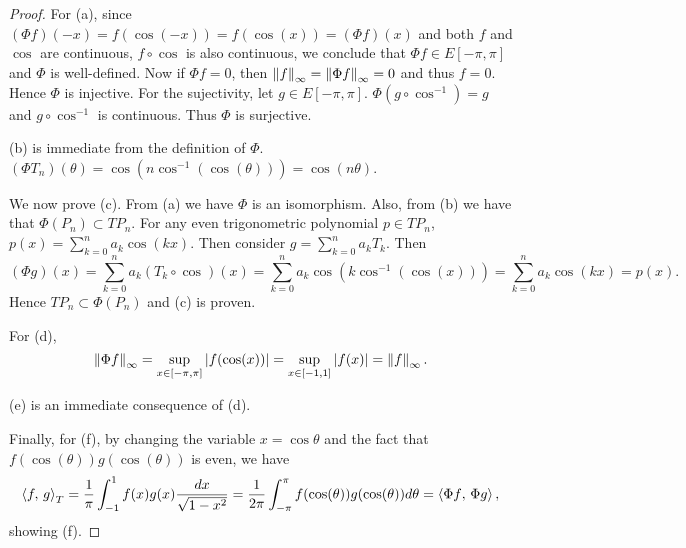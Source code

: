 \begin{proof}
    For (a), since $(\Phi f)(-x) = f(\cos(-x)) = f(\cos(x)) =( \Phi f)(x)$ and 
    both $f$ and $\cos$ are continuous, $f\circ \cos$ is also continuous, 
    we conclude that $\Phi f\in E[-\pi,\pi]$ and $\Phi$ is well-defined. 
    Now if $\Phi f = 0$, then $\left\lVert {f} \right\rVert_\infty = \left\lVert {\Phi f} \right\rVert_\infty = 0$ 
    and thus $f = 0$. Hence $\Phi$ is injective. For the sujectivity, let 
    $g\in E[-\pi,\pi]$. $\Phi (g\circ\cos^{-1}) = g$ and $g\circ\cos^{-1}$ 
    is continuous. Thus $\Phi$ is surjective. 

    (b) is immediate from the definition of $\Phi$. $(\Phi T_n)(\theta) 
    = \cos(n\cos^{-1}(\cos(\theta))) = \cos(n\theta)$.

    We now prove (c). From (a) we have $\Phi$ is an isomorphism. Also, 
    from (b) we have that $\Phi(P_n)\subset TP_n$. For any even trigonometric 
    polynomial $p\in TP_n$, $p(x) = \sum_{k=0}^n a_k\cos(kx)$. Then 
    consider $g = \sum_{k=0}^{n} a_kT_k$. Then 
    \begin{equation*}
        (\Phi g)(x) = \sum_{k=0}^{n} a_k(T_k\circ\cos)(x) = \sum_{k=0}^{n} a_k\cos(k\cos^{-1}(\cos(x))) = \sum_{k=0}^{n} a_k\cos(kx) = p(x).
    \end{equation*}
    Hence $TP_n\subset \Phi(P_n)$ and (c) is proven. 

    For (d), 
    \begin{equation*}
        \left\lVert {\Phi f} \right\rVert_\infty = \sup_{x\in[-\pi,\pi]} \left\lvert {f(\cos(x))} \right\rvert = \sup_{x\in[-1,1]}\left\lvert {f(x)} \right\rvert = \left\lVert {f} \right\rVert_\infty.
    \end{equation*} 

    (e) is an immediate consequence of (d). 

    Finally, for (f), by changing the variable $x = \cos\theta$ and 
    the fact that $f(\cos(\theta))g(\cos(\theta))$ is even, we have
    \begin{equation*}
        \left\langle {f},\, {g} \right\rangle_T = \frac{1}{\pi}\int_{-1}^{1} f(x)g(x)\frac{dx}{\sqrt{1-x^2}} = \frac{1}{2\pi}\int_{-\pi}^{\pi} f(\cos(\theta))g(\cos(\theta))d\theta = \left\langle {\Phi f},\, {\Phi g} \right\rangle,
    \end{equation*}
    showing (f).
\end{proof}

